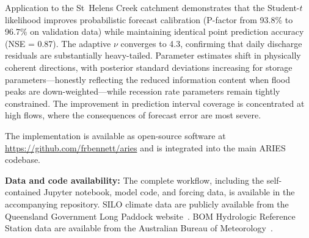 \documentclass[article,nojss]{jss}
\begin{document}
Application to the St~Helens Creek catchment demonstrates that the
Student-$t$ likelihood improves probabilistic forecast calibration
(P-factor from 93.8\% to 96.7\% on validation data) while maintaining
identical point prediction accuracy (NSE = 0.87).
The adaptive $\nu$ converges to 4.3, confirming that daily discharge
residuals are substantially heavy-tailed.
Parameter estimates shift in physically coherent directions, with
posterior standard deviations increasing for storage
parameters---honestly reflecting the reduced information content when
flood peaks are down-weighted---while recession rate parameters remain
tightly constrained.
The improvement in prediction interval coverage is concentrated at high
flows, where the consequences of forecast error are most severe.

The implementation is available as open-source software at
\url{https://github.com/frbennett/aries} and is integrated into the
main ARIES codebase.

\vspace{1em}
\noindent\textbf{Data and code availability:}
The complete workflow, including the self-contained Jupyter notebook,
model code, and forcing data, is available in the accompanying
repository.
SILO climate data are publicly available from the Queensland Government
Long Paddock website~\cite{Jeffrey2001}.
BOM Hydrologic Reference Station data are available from the Australian
Bureau of Meteorology~\cite{Zhang2014}.
\end{document}
